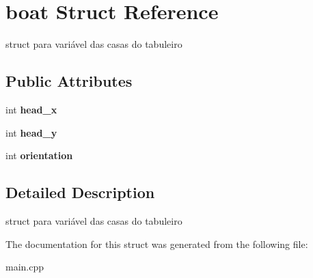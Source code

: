 \hypertarget{structboat}{}\section{boat Struct Reference}
\label{structboat}


struct para variável das casas do tabuleiro  


\subsection*{Public Attributes}
\begin{DoxyCompactItemize}
\item 
\mbox{\label{structboat_a1284a406b81a579f159825aa0ecb9f34}} 
int {\bfseries head\+\_\+x}
\item 
\mbox{\label{structboat_a2e4c951bad6935ce82eb1d31ac6c9c30}} 
int {\bfseries head\+\_\+y}
\item 
\mbox{\label{structboat_a64a29e270bd6df167808090153ea8ce1}} 
int {\bfseries orientation}
\end{DoxyCompactItemize}


\subsection{Detailed Description}
struct para variável das casas do tabuleiro 

The documentation for this struct was generated from the following file\+:\begin{DoxyCompactItemize}
\item 
main.\+cpp\end{DoxyCompactItemize}

